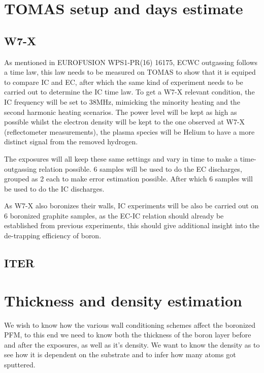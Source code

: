 \documentclass{article}
\begin{document}
\section{TOMAS setup and days estimate}
\subsection{W7-X}
As mentioned in EUROFUSION WPS1-PR(16) 16175, ECWC outgassing follows a time law, this law 
needs to be measured on TOMAS to show that it is equiped to compare IC and EC, after which
the same kind of experiment needs to be carried out to determine the IC time law.
To get a W7-X relevant condition, the IC frequency will be set to 38MHz, mimicking the minority heating
and the second harmonic heating scenarios. The power level will be kept as high as possible whilst the electron density
will be kept to the one observed at W7-X (reflectometer measurements), the plasma species will be Helium to have
a more distinct signal from the removed hydrogen.

The exposures will all keep these same settings and vary in time to make a time-outgassing relation possible.
6 samples will be used to do the EC discharges, grouped as 2 each to make error estimation possible. After which
6 samples will be used to do the IC discharges. 

As W7-X also boronizes their walls, IC experiments will be also be carried out on 6 boronized graphite samples,
as the EC-IC relation should already be established from previous experiments, this should give additional insight
into the de-trapping efficiency of boron.
\subsection{ITER}

\section{Thickness and density estimation}
We wish to know how the various wall conditioning schemes affect the boronized PFM, to
this end we need to know both the thickness of the boron layer before and after the
exposures, as well as it's density.  We want to know the density as to see how
it is dependent on the substrate and to infer how many atoms got sputtered.
\end{document}
